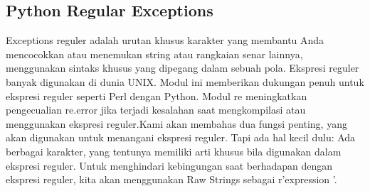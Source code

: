 \subsection{Python Regular Exceptions}
 Exceptions reguler adalah urutan khusus karakter yang membantu Anda mencocokkan atau menemukan string atau rangkaian senar lainnya, menggunakan sintaks khusus yang dipegang dalam sebuah pola. Ekspresi reguler banyak digunakan di dunia UNIX. Modul ini memberikan dukungan penuh untuk ekspresi reguler seperti Perl dengan Python. Modul re meningkatkan pengecualian re.error jika terjadi kesalahan saat mengkompilasi atau menggunakan ekspresi reguler.Kami akan membahas dua fungsi penting, yang akan digunakan untuk menangani ekspresi reguler. Tapi ada hal kecil dulu: Ada berbagai karakter, yang tentunya memiliki arti khusus bila digunakan dalam ekspresi reguler. Untuk menghindari kebingungan saat berhadapan dengan ekspresi reguler, kita akan menggunakan Raw Strings sebagai r'expression '.
